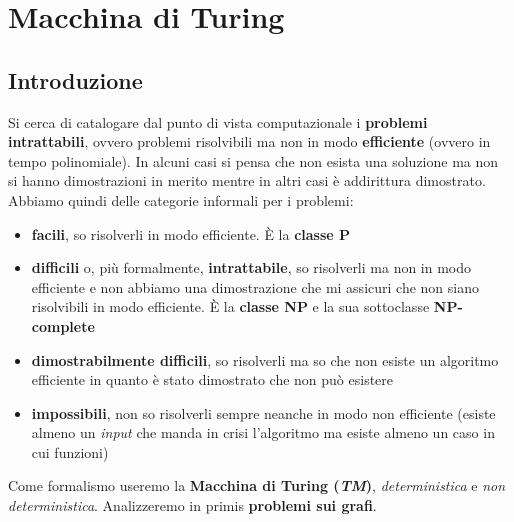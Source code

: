 \chapter{Macchina di Turing}
\section{Introduzione}Si cerca di catalogare dal punto di vista computazionale i \textbf{problemi
  intrattabili}, ovvero problemi risolvibili ma non in modo \textbf{efficiente}
(ovvero in tempo polinomiale). In alcuni casi si pensa che non esista una
soluzione ma non si hanno dimostrazioni in merito mentre in altri casi è
addirittura dimostrato. Abbiamo quindi delle categorie informali per i problemi:
\begin{itemize}
  \item \textbf{facili}, so risolverli in modo efficiente. È la \textbf{classe P}
  \item \textbf{difficili} o, più formalmente, \textbf{intrattabile}, so
  risolverli ma non in modo efficiente e non abbiamo una 
  dimostrazione che mi assicuri che non siano risolvibili in modo efficiente. È
  la \textbf{classe NP} e la sua sottoclasse \textbf{NP-complete}
  \item \textbf{dimostrabilmente difficili}, so risolverli ma so che non esiste
  un algoritmo efficiente in quanto è stato dimostrato che non può esistere
  \item \textbf{impossibili}, non so risolverli sempre neanche in modo non
  efficiente (esiste almeno un \textit{input} che manda in crisi l'algoritmo ma esiste
  almeno un caso in cui funzioni)
\end{itemize}
Come formalismo useremo la \textbf{Macchina di Turing (\textit{TM})},
\textit{deterministica} e \textit{non deterministica}. Analizzeremo in primis
\textbf{problemi sui grafi}. 
